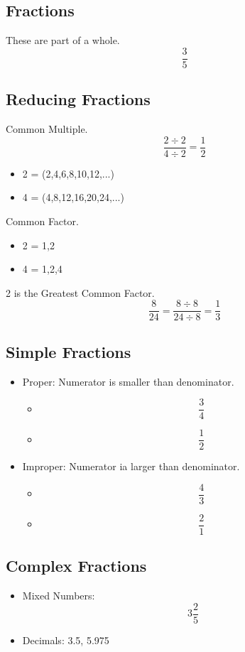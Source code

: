 \documentclass[]{article}
\begin{document}
\subsection{Fractions}
These are part of a whole.
\begin{equation}
	\frac {3}{5} 
\end{equation}

\subsection{Reducing Fractions}
Common Multiple.
\begin{equation}
	\frac {2 \div 2}{4 \div 2} = \frac{1}{2}
\end{equation}
	\begin{itemize}
		\item 2 = (2,4,6,8,10,12,...)
		\item 4 = (4,8,12,16,20,24,...)
	\end{itemize}
Common Factor.
	\begin{itemize}
		\item 2 = 1,2
		\item 4 = 1,2,4
	\end{itemize}
		2 is the Greatest Common Factor.
\begin{equation}
\frac {8}{24} = \frac {8 \div 8}{24 \div 8} = \frac {1}{3}
\end{equation}

\subsection{Simple Fractions}
\begin{itemize}
	\item Proper: Numerator is smaller than denominator. 
	\begin{itemize}
		\item \begin{equation}
			\frac{3}{4} 
		\end{equation}
		\item \begin{equation}
			\frac{1}{2}
		\end{equation}
	\end{itemize}
	\item Improper: Numerator ia larger than denominator. 
		\begin{itemize}
			\item \begin{equation}
			\frac{4}{3} 
			\end{equation}
			\item \begin{equation}
			\frac{2}{1}
			\end{equation}
		\end{itemize}
\end{itemize}

\subsection{Complex Fractions}
\begin{itemize}
	\item Mixed Numbers:
	\begin{equation}
	3 \frac{2}{5}
	\end{equation}
	\item Decimals:  3.5, 5.975
\end{itemize}
\end{document}
